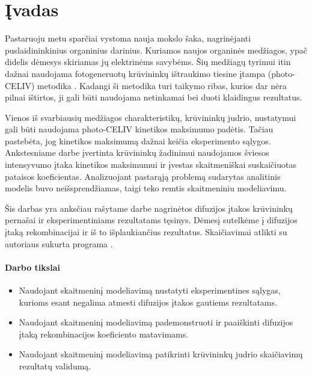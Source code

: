 \section{Įvadas}

Pastaruoju metu sparčiai vystoma nauja mokslo šaka, nagrinėjanti puslaidininkinius organinius darinius. Kuriamos naujos organinės medžiagos, ypač didelis dėmesys skiriamas jų elektrinėms savybėms. Šių medžiagų tyrimui itin dažnai naudojama fotogeneruotų krūvininkų ištraukimo tiesine įtampa (photo-CELIV) metodika \cite{juška:155202}. Kadangi ši metodika turi taikymo ribas, kurios dar nėra pilnai ištirtos, ji gali būti naudojama netinkamai bei duoti klaidingus rezultatus.

Vienos iš svarbiausių medžiagos charakteristikų, krūvininkų judrio, nustatymui gali būti naudojama photo-CELIV kinetikos maksimumo padėtis. Tačiau pastebėta, jog kinetikos maksimumą dažnai keičia eksperimento sąlygos. Ankstesniame darbe įvertinta krūvininkų žadinimui naudojamos šviesos intensyvumo įtaka kinetikos maksimumui \cite{juška:4946} ir įvestas skaitmeniškai suskaičiuotas pataisos koeficientas. Analizuojant pastarąją problemą sudarytas analitinis modelis buvo neišsprendžiamas, taigi teko remtis skaitmeniniu modeliavimu. 

Šis darbas yra anksčiau rašytame darbe \cite{vytis:kursinis} nagrinėtos difuzijos įtakos krūvininkų pernašai ir eksperimentiniams rezultatams tęsinys. Dėmesį sutelkėme į difuzijos įtaką rekombinacijai ir iš to išplaukiančius rezultatus. Skaičiavimai atlikti su autoriaus sukurta programa \cite{vytis:openreadings2010}. 

\paragraph{Darbo tikslai}
\begin{itemize}
\item Naudojant skaitmeninį modeliavimą nustatyti eksperimentines sąlygas, kurioms esant negalima atmesti difuzijos įtakos gautiems rezultatams.
\item Naudojant skaitmeninį modeliavimą pademonstruoti ir paaiškinti difuzijos įtaką rekombinacijos koeficiento matavimams.
\item Naudojant skaitmeninį modeliavimą patikrinti krūvininkų judrio skaičiavimų rezultatų validumą.
\end{itemize}
